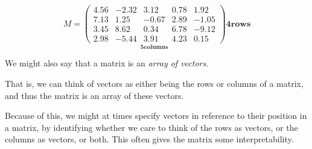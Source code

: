 \documentclass{ximera}
\begin{document}
\[
M =
\underset{\displaystyle\boldsymbol{5}\textbf{columns}}{
\begin{pmatrix}
4.56 & -2.32 & 3.12 & 0.78 & 1.92 \\
7.13 & 1.25 & -0.67 & 2.89 & -1.05 \\
3.45 & 8.62 & 0.34 & 6.78 & -9.12 \\
2.98 & -5.44 & 3.91 & 4.23 & 0.15
\end{pmatrix}}
\boldsymbol{4}\textbf{rows}
\]

\begin{definition}\label{def:matrixasarray}

    We might also say that a matrix is an \emph{array of vectors}. 
    
    That is, we can think of vectors as either being the rows or columns of a matrix, and thus the matrix is an array of these vectors.

\end{definition}

Because of this, we might at times specify vectors in reference to their position in a matrix, by identifying whether we care to think of the rows as vectors, or the columns as vectors, or both. This often gives the matrix some interpretability.
\end{document}
